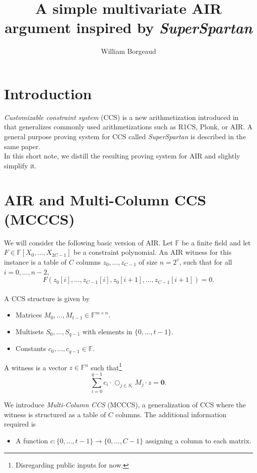 \documentclass[a4paper]{article}
\title{A simple multivariate AIR argument inspired by \emph{SuperSpartan}}
\author{William Borgeaud}
\date{}
\begin{document}
\maketitle


\section*{Introduction}
\emph{Customizable constraint system} (CCS) is a new arithmetization introduced in \cite{cryptoeprint:2023/552} that generalizes commonly used arithmetizations such as R1CS, Plonk, or AIR. A general purpose proving system for CCS called \emph{SuperSpartan} is described in the same paper.\\
In this short note, we distill the resulting proving system for AIR and slightly simplify it.


\section*{AIR and Multi-Column CCS (MCCCS)}
We will consider the following basic version of AIR. Let $\mathbb{F}$ be a finite field and let $F \in \mathbb{F}[X_0,\dots,X_{2C-1}]$ be a constraint polynomial. An AIR witness for this instance is a table of $C$ columns $z_0,\dots,z_{C-1}$ of size $n=2^v$, such that for all $i=0,\dots,n-2$,
$$
F(z_0[i],\dots,z_{C-1}[i],z_0[i+1],\dots,z_{C-1}[i+1])=0.
$$
\\
A CCS structure \cite{cryptoeprint:2023/552} is given by 
\begin{itemize}
    \item Matrices $M_0,\dots,M_{t-1}\in \mathbb{F}^{m\times n}$.
    \item Multisets $S_0,\dots,S_{q-1}$ with elements in $\{0,\dots,t-1\}$.
    \item Constants $c_0,\dots,c_{q-1}\in \mathbb{F}$.
\end{itemize}

A witness is a vector $z\in\mathbb{F}^n$ such that\footnote{Disregarding public inputs for now.}
$$
\sum_{i=0}^{q-1} c_i \cdot \bigcirc_{j\in S_i} M_j \cdot z = \mathbf{0}.
$$

We introduce \emph{Multi-Column CCS} (MCCCS), a generalization of CCS where the witness is structured as a table of $C$ columns. The additional information required is
\begin{itemize}
    \item A function $c:\{0,\dots,t-1\} \to \{0,\dots,C-1\}$ assigning a column to each matrix.
\end{itemize}
\end{document}
